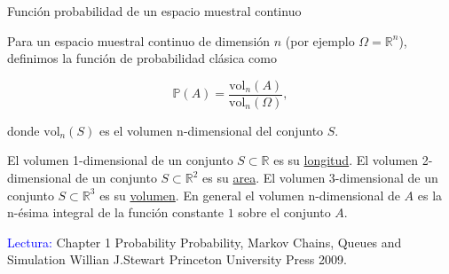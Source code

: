 \documentclass{beamer}
\begin{document}
\begin{frame}{Funci\'on  probabilidad de un espacio muestral continuo}
\small{Para un espacio muestral continuo de dimensi\'on $n$ (por ejemplo $\Omega = \mathbb{R}^n$), definimos la funci\'on de probabilidad cl\'asica como
 
 
 \[
 \mathbb{P}(A)=\frac{\text{vol}_n(A)}{\text{vol}_n(\Omega)},
 \]
 
 donde $\text{vol}_n(S)$ es el volumen n-dimensional del conjunto $S$. }
 
 \vspace{0.2cm}
 
 \scriptsize{El volumen 1-dimensional de un conjunto $S\subset \mathbb{R}$ es su \underline{longitud}. El volumen 2-dimensional de un conjunto $S\subset \mathbb{R}^2$ es su \underline{area}.  El volumen 3-dimensional de un conjunto $ S \subset \mathbb{R}^3$ es su \underline{volumen}. En general el volumen n-dimensional de $A$ es la n-\'esima integral de la funci\'on constante $1$ sobre el conjunto $A$.}
 
 
 \vspace{0.2cm}
 
 \scriptsize{\textcolor{blue}{Lectura:} Chapter 1 Probability Probability, Markov Chains, Queues and Simulation Willian J.Stewart Princeton University Press 2009.}
\end{frame}
\end{document}
